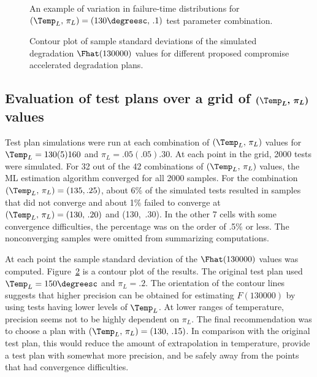 \begin{figure}
\caption{An example of variation in failure-time distributions for
$(\Temp_{L}, \, \pi_{L}) = (130 \degreesc, \, .1)$ test parameter
combination.}
\label{figure:adtplan.sim.cdfs.ps}
\end{figure}
%
\begin{figure}
\caption{Contour plot of sample standard deviations of
the simulated degradation $\Fhat(130000)$ values for different
proposed compromise accelerated degradation plans.}
\label{figure:adtplan.contour.ps}
\end{figure}
\subsection{Evaluation of test plans over a 
grid of $\boldsymbol{(\Temp_{L}, \, \pi_{L})}$ values}

Test plan simulations were run at each combination of $(\Temp_{L}, \,
\pi_{L})$ values for $\Temp_{L}= 130(5)160$ and $\pi_{L}=
.05(.05).30$. At each point in the grid, 2000 tests were
simulated. For 32 out of the 42 combinations of $(\Temp_{L}, \,
\pi_{L})$ values, the ML estimation algorithm  converged for all 2000 samples. For 
the combination $(\Temp_{L}, \, \pi_{L})=(135,.25)$, about 6\% of
the simulated tests resulted in samples that did not converge and
about 1\% failed to converge at $(\Temp_{L}, \, \pi_{L})=(130, \,
.20)$ and (130, \,.30). In the other 7 cells with some convergence
difficulties, the percentage was on the order of .5\% or less. The
nonconverging samples were omitted from summarizing computations.

At each point the sample standard deviation of the
$\Fhat(130000)$ values was computed.
Figure~\ref{figure:adtplan.contour.ps} is a contour plot of the
results.  The original test plan used $\Temp_{L}=150\degreesc$ and
$\pi_{L}=.2$. The orientation of the contour lines suggests that
higher precision can be obtained for estimating $F(130000)$ by using
tests having lower levels of $\Temp_{L}$. At lower ranges of
temperature, precision seems not to be highly dependent on
$\pi_{L}$. The final recommendation was to choose a plan with
$(\Temp_{L}, \, \pi_{L})=(130, \, .15)$. In comparison with the original
test plan, this would reduce the amount of extrapolation in
temperature, provide a test plan with somewhat more precision, and be
safely away from the points that had convergence difficulties.


